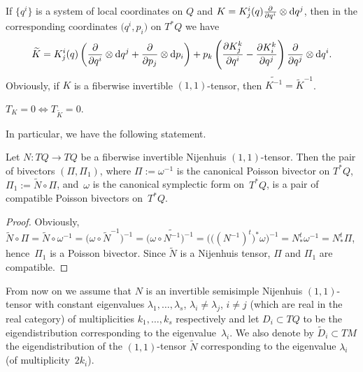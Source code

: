 If $\{q^i\}$ is a system of local coordinates on $Q$ and $K=K^i_j (q) \frac{\partial}{\partial q^i } \otimes {\rm d}q^j $, then in the corresponding coordinates $\big(q^i, p_i\big)$ on $T^*Q$ we have
\begin{gather*}
\widetilde{K}= K^i_j (q) \left( \frac{\partial}{\partial q^i } \otimes {\rm d}q^j + \frac{\partial}{\partial p_j } \otimes {\rm d}p_i \right)
+ p_k \left( \frac{\partial K^k_j }{\partial q^i} - \frac{\partial K^k_i }{\partial q^j} \right) \frac{\partial}{\partial q^j}\otimes {\rm d}q^i
.\end{gather*}
Obviously, if $K$ is a fiberwise invertible $(1,1)$-tensor, then $\widetilde{K^{-1}}=\widetilde{K}^{-1}$.

\begin{Lemma}[\cite{t12}]\label{tors} $T_K=0\Longleftrightarrow T_{\widetilde{K}}=0$.
\end{Lemma}

In particular, we have the following statement.

\begin{Lemma}\label{constt}Let $N\colon TQ\to TQ$ be a fiberwise invertible Nijenhuis $(1,1)$-tensor. Then the pair of bivectors $(\Pi,\Pi_1)$, where $\Pi:=\omega^{-1}$ is the canonical Poisson bivector on $T^*Q$, $\Pi_1:=\widetilde{N}\circ\Pi$, and~$\omega $ is the canonical symplectic form on~$T^*Q$, is a pair of compatible Poisson bivectors on~$T^*Q$.
\end{Lemma}

\begin{proof} Obviously, $\widetilde{N}\circ\Pi=\widetilde{N}\circ \omega^{-1}=\big(\omega\circ \widetilde{N}^{-1}\big)^{-1}=\big(\omega\circ \widetilde{N^{-1}}\big)^{-1}=\big(\big((N^{-1})^t\big)^*\omega\big)^{-1}=N^t_*\omega^{-1}=N^t_*\Pi$, hence~$\Pi_1$ is a Poisson bivector. Since $\widetilde{N}$ is a Nijenhuis tensor, $\Pi$ and $\Pi_1$ are compatible.
\end{proof}

From now on we assume that $N$ is an invertible semisimple Nijenhuis $(1,1)$-tensor with constant eigenvalues $\lambda_1,\dots,\lambda_s$, $\lambda_i\not=\lambda_j$, $i\not=j$ (which are real in the real category) of multiplicities $k_1,\dots,k_s$ respectively and let $D_i \subset TQ$ to be the eigendistribution corresponding to the eigenvalue~$\lambda_i$. We also denote by $\widetilde{ D}_i \subset TM$ the eigendistribution of the $(1,1)$-tensor $\widetilde{N}$ corresponding to the eigenvalue $\lambda_i$ (of multiplicity~$2k_i$).

